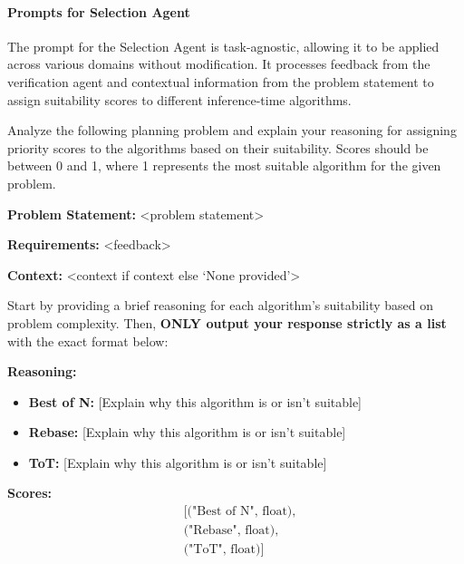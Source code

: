 \paragraph{Prompts for Selection Agent}

The prompt for the Selection Agent is task-agnostic, allowing it to be applied across various domains without modification. It processes feedback from the verification agent and contextual information from the problem statement to assign suitability scores to different inference-time algorithms.

\begin{tcolorbox}[boxrule=0pt, frame hidden, title=Prompt, breakable, sharp corners, borderline west={0pt}{0pt}{black!50}, title style={
        colback=black!50, %
        colframe=black!50, %
        coltitle=black %
    }]

Analyze the following planning problem and explain your reasoning for assigning priority scores to the algorithms based on their suitability. Scores should be between 0 and 1, where 1 represents the most suitable algorithm for the given problem.

\textbf{Problem Statement:} <problem statement>

\textbf{Requirements:} <feedback>

\textbf{Context:} <context if context else `None provided'>

Start by providing a brief reasoning for each algorithm's suitability based on problem complexity. Then, \textbf{ONLY output your response strictly as a list} with the exact format below:

\textbf{Reasoning:}
\begin{itemize}
    \item \textbf{Best of N:} [Explain why this algorithm is or isn’t suitable]
    \item \textbf{Rebase:} [Explain why this algorithm is or isn’t suitable]
    \item \textbf{ToT:} [Explain why this algorithm is or isn’t suitable]
\end{itemize}

\textbf{Scores:}
\begin{equation*}
\begin{aligned}
&[\text{("Best of N", float)}, \\
&\text{("Rebase", float)}, \\
&\text{("ToT", float)}]
\end{aligned}
\end{equation*}

\end{tcolorbox}

